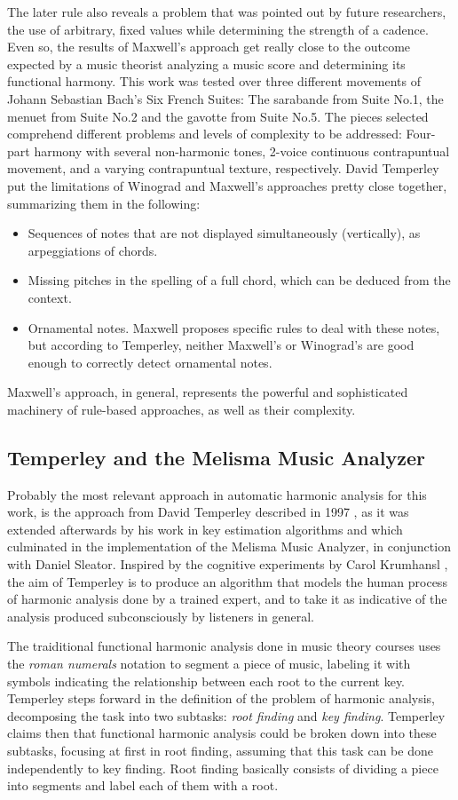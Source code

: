     The later rule also reveals a problem that was pointed out by future researchers, the use of arbitrary, fixed values while determining the strength of a cadence. Even so, the results of Maxwell's approach get really close to the outcome expected by a music theorist analyzing a music score and determining its functional harmony. This work was tested over three different movements of Johann Sebastian Bach's Six French Suites: The sarabande from Suite No.1, the menuet from Suite No.2 and the gavotte from Suite No.5. The pieces selected comprehend different problems and levels of complexity to be addressed: Four-part harmony with several non-harmonic tones, 2-voice continuous contrapuntual movement, and a varying contrapuntual texture, respectively. David Temperley put the limitations of Winograd and Maxwell's approaches pretty close together, summarizing them in the following:
		\begin{itemize}
			\item Sequences of notes that are not displayed simultaneously (vertically), as arpeggiations of chords.
			\item Missing pitches in the spelling of a full chord, which can be deduced from the context.
			\item Ornamental notes. Maxwell proposes specific rules to deal with these notes, but according to Temperley, neither Maxwell's or Winograd's are good enough to correctly detect ornamental notes.
    \end{itemize}
    Maxwell's approach, in general, represents the powerful and sophisticated machinery of rule-based approaches, as well as their complexity.
    \subsection{Temperley and the Melisma Music Analyzer}
    Probably the most relevant approach in automatic harmonic analysis for this work, is the approach from David Temperley described in 1997 \cite{temperley1997algorithm}, as it was extended afterwards by his work in key estimation algorithms and which culminated in the implementation of the Melisma Music Analyzer, in conjunction with Daniel Sleator.
    Inspired by the cognitive experiments by Carol Krumhansl \cite{krumhansl2001cognitive}, the aim of Temperley is to produce an algorithm that models the human process of harmonic analysis done by a trained expert, and to take it as indicative of the analysis produced subconsciously by listeners in general.

		The traiditional functional harmonic analysis done in music theory courses uses the \emph{roman numerals} notation to segment a piece of music, labeling it with symbols indicating the relationship between each root to the current key. Temperley steps forward in the definition of the problem of harmonic analysis, decomposing the task into two subtasks: \emph{root finding} and \emph{key finding}. Temperley claims then that functional harmonic analysis could be broken down into these subtasks, focusing at first in root finding, assuming that this task can be done independently to key finding. Root finding basically consists of dividing a piece into segments and label each of them with a root.

